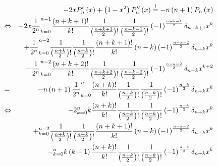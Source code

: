 \documentclass{book}
\newcommand{\hastobe}{\stackrel{!}{=}}
\let\sum\relax
\DeclareMathOperator*{\sum}{\raisebox{-3.5pt}{\scalebox{2}{\rotatebox{1}{{\bask Σ}}}}}
\begin{document}
\begin{eqnarray}
&&- 2xP_n'\left(x\right) + \left(1 - x^2\right)P_n''\left(x\right)\hastobe - n\left(n + 1\right)P_n\left(x\right)\nonumber\\
&\Leftrightarrow&
- 2x\frac{1}{2^n}\sum_{k = 0}^{n - 1}\frac{\left(n + k + 1\right)!}{k!}\frac{1}{\left(\frac{n + k + 1}{2}\right)!}\frac{1}{\left(\frac{n - k - 1}{2}\right)!}\left(-1\right)^{\frac{n - k - 1}{2}}\delta_{n + k + 1}x^k\nonumber\\
&&+ \frac{1}{2^n}\sum_{k = 0}^{n - 2}\frac{1}{\left(\frac{n + k}{2}\right)!}\frac{1}{\left(\frac{n - k}{2}\right)!}\frac{\left(n + k + 1\right)!}{k!}\left(n - k\right)\left(-1\right)^{\frac{n - k - 2}{2}}\delta_{n + k}x^k\nonumber\\
&&- \frac{1}{2^n}\sum_{k = 0}^{n - 2}\frac{\left(n + k + 2\right)!}{k!}\frac{1}{\left(\frac{n + k + 2}{2}\right)!}\frac{1}{\left(\frac{n - k - 2}{2}\right)!}\left(-1\right)^{\frac{n - k - 2}{2}}\delta_{n + k}x^{k + 2}\nonumber\\
& = & -n\left(n + 1\right)\frac{1}{2^n}\sum_{k = 0}^{n}\frac{\left(n + k\right)!}{k!}\frac{1}{\left(\frac{n + k}{2}\right)!}\frac{1}{\left(\frac{n - k}{2}\right)!}\left(-1\right)^{\frac{n - k}{2}}\delta_{n + k}x^k\nonumber\\
&\Leftrightarrow& -2\sum_{k = 0}^{n}k\frac{\left(n + k\right)!}{k!}\frac{1}{\left(\frac{n + k}{2}\right)!}\frac{1}{\left(\frac{n - k}{2}\right)!}\left(-1\right)^{\frac{n - k}{2}}\delta_{n + k}x^k\nonumber\\
&&+ \sum_{k = 0}^{n - 2}\frac{1}{\left(\frac{n + k}{2}\right)!}\frac{1}{\left(\frac{n - k}{2}\right)!}\frac{\left(n + k + 1\right)!}{k!}\left(n - k\right)\left(-1\right)^{\frac{n - k - 2}{2}}\delta_{n + k}x^k\nonumber\\
&&- \sum_{k = 0}^{n}k\left(k - 1\right)\frac{\left(n + k\right)!}{k!}\frac{1}{\left(\frac{n + k}{2}\right)!}\frac{1}{\left(\frac{n - k}{2}\right)!}\left(-1\right)^{\frac{n - k}{2}}\delta_{n + k}x^k\nonumber
\end{eqnarray}
\end{document}
